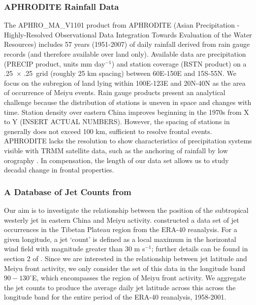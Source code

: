 \documentclass[draft,grl]{AGUTeX}
\begin{document}
\begin{article}
\subsubsection{APHRODITE Rainfall Data}

	The APHRO\_MA\_V1101 product from APHRODITE (Asian Precipitation - Highly-Resolved Observational Data Integration Towards Evaluation of the Water Resources) \citep{Yatagai2012} includes 57 years (1951-2007) of daily  rainfall derived from rain gauge records (and therefore available over land only). Available data are precipitation (PRECIP product, units mm day$^{-1}$) and station coverage (RSTN product) on a .25\textdegree\ $\times$ .25\textdegree\ grid (roughly 25 km spacing) between 60\textdegree E-150\textdegree E and 15\textdegree S-55\textdegree N. We focus on the subregion of land lying within 100\textdegree E-123\textdegree E and 20\textdegree N-40\textdegree N as the area of occurrence of Meiyu events. Rain gauge products present an analytical challenge because the distribution of stations is uneven in space and changes with time. Station density over eastern China improves beginning in the 1970s from X to Y (INSERT ACTUAL NUMBERS). However, the spacing of stations in generally does not exceed 100 km, sufficient to resolve frontal events. APHRODITE lacks the resolution to show characteristics of precipitation systems visible with TRMM satellite data, such as the anchoring of rainfall by low orography \citep{Xu2009}. In compensation, the length of our data set allows us to study decadal change in frontal properties. 
	
\subsubsection{A Database of Jet Counts from \citep{Schiemann2009}} 

	Our aim is to investigate the relationship between the position of the subtropical westerly jet in eastern China and Meiyu activity. \citep{Schiemann2009} constructed a data set of jet occurrences in the Tibetan Plateau region from the ERA-40 reanalysis.  For a given longitude, a jet `count'  is defined as a local maximum in the horizontal wind field with magnitude greater than $30$ m s$^{-1}$; further details can be found in section 2 of \citep{Schiemann2009}. Since we are interested in the relationship between jet latitude and Meiyu front activity, we only consider the set of this data in the longitude band $90-130^\circ$E, which encompasses the region of Meiyu front activity. We aggregate the jet counts to produce the average daily jet latitude across this across the longitude band for the entire period of the ERA-40 reanalysis, 1958-2001. 
	

\end{article}
\end{document}
